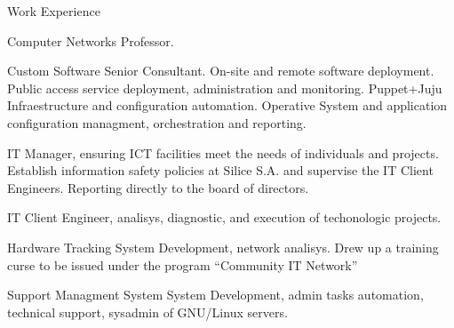 \begin{rubric}{Work Experience}

 Computer Networks Professor. 

 Custom Software Senior Consultant. On-site
	and remote software deployment. Public access service deployment, administration and monitoring. 
	Puppet+Juju Infraestructure and configuration automation. Operative System and application 
	configuration managment, orchestration and reporting.

 IT Manager, ensuring ICT facilities meet the needs of 
	individuals and projects. Establish information safety policies at Silice S.A. and supervise 
	the IT Client Engineers. Reporting directly to the board of directors.

 IT Client Engineer, analisys, diagnostic, and execution of techonologic projects.

 Hardware Tracking System Development, network analisys. Drew up
	a training curse to be issued under the program ``Community IT Network''

 Support Managment System System Development,  
	admin tasks automation, technical support, sysadmin of GNU/Linux servers.
\end{rubric}

